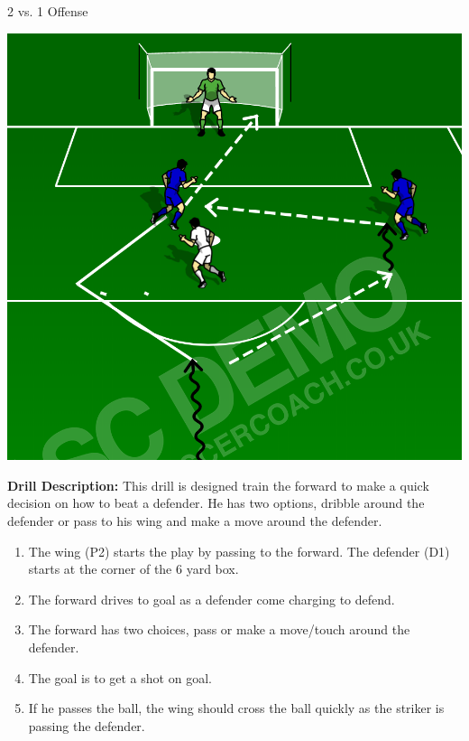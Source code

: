 \begin{evenBlock}{2 vs. 1 Offense}
\begin{minipage}[t]{\linewidth}
\begin{minipage}{.3\linewidth}
            \includegraphics[width=\textwidth]{../img/Trimmed/2v1_Option_Pass}
    \end{minipage}
    \hspace{0.05\linewidth}
    \begin{minipage}{.6\linewidth} %
        \textbf{Drill Description:}
        This drill is designed train the forward to make a quick decision on how to beat a defender.  He has two options, dribble around the defender or pass to his wing and make a move around the defender. 
        \begin{enumerate}
        \setlength{\itemsep}{0pt}
        \setlength{\parskip}{0pt}
        \setlength{\parsep}{0pt}
        \item The wing (P2) starts the play by passing to the forward.  The defender (D1) starts at the corner of the 6 yard box.
        \item The forward drives to goal as a defender come charging to defend.
        \item The forward has two choices, pass or make a move/touch around the defender.
        \item The goal is to get a shot on goal.
        \item If he passes the ball, the wing should cross the ball quickly as the striker is passing the defender.
        \end{enumerate}


\end{minipage}
\end{minipage}
\end{evenBlock}
